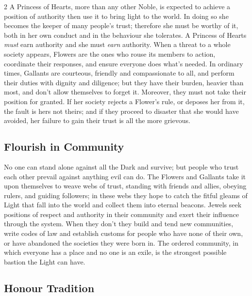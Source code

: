 \begin{multicols}{2}
A Princess of Hearts, more than any other Noble, is expected to achieve a position of authority then use it to bring light to the world. In doing so she becomes the keeper of many people's trust; therefore she must be worthy of it, both in her own conduct and in the behaviour she tolerates. A Princess of Hearts \textit{must} earn authority and she must \textit{earn} authority. When a threat to a whole society appears, Flowers are the ones who rouse its members to action, coordinate their responses, and ensure everyone does what's needed. In ordinary times, Gallants are courteous, friendly and compassionate to all, and perform their duties with dignity and diligence; but they have their burden, heavier than most, and don't allow themselves to forget it. Moreover, they must not take their position for granted. If her society rejects a Flower's rule, or deposes her from it, the fault is hers not theirs; and if they proceed to disaster that she would have avoided, her failure to gain their trust is all the more grievous.

\subsection*{Flourish in Community}

No one can stand alone against all the Dark and survive; but people who trust each other prevail against anything evil can do. The Flowers and Gallants take it upon themselves to weave webs of trust, standing with friends and allies, obeying rulers, and guiding followers; in these webs they hope to catch the fitful gleams of Light that fall into the world and collect them into eternal beacons. Jewels seek positions of respect and authority in their community and exert their influence through the system. When they don't they build and tend new communities, write codes of law and establish customs for people who have none of their own, or have abandoned the societies they were born in. The ordered community, in which everyone has a place and no one is an exile, is the strongest possible bastion the Light can have.

\subsection*{Honour Tradition}


\end{multicols}
